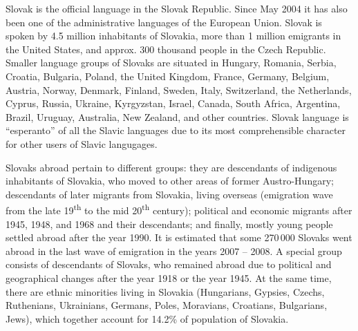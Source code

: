 \begin{multicols}{2}
Slovak is the official language in the Slovak Republic. Since May 2004 it has also been one of the administrative languages of the European Union. Slovak is spoken by 4.5 million inhabitants of Slovakia, more than 1 million emigrants in the United States, and approx. 300 thousand people in the Czech Republic. Smaller language groups of Slovaks are situated in Hungary, Romania, Serbia, Croatia, Bulgaria, Poland, the United Kingdom, France, Germany, Belgium, Austria, Norway, Denmark, Finland, Sweden, Italy, Switzerland, the Netherlands, Cyprus, Russia, Ukraine, Kyrgyzstan, Israel, Canada, South Africa, Argentina, Brazil, Uruguay, Australia, New Zealand,  and other countries. Slovak language is ``esperanto'' of all the Slavic languages due to its most comprehensible character for other users of Slavic langugages.


 Slovaks abroad pertain to different groups: they are descendants of indigenous
inhabitants of Slovakia, who moved to other areas of former Austro-Hungary;
descendants of later migrants from Slovakia, living overseas (emigration wave
from the late 19\textsuperscript{th} to the mid 20\textsuperscript{th}
century); political and economic migrants after 1945, 1948, and 1968 and their
descendants; and finally, mostly young people settled abroad after the year
1990. It is estimated that some 270\,000 Slovaks went abroad in the last wave
of emigration in the years 2007 – 2008. A special group consists of descendants
of  Slovaks, who remained abroad due to political and geographical changes
after the year 1918 or the year 1945. At the same time, there are ethnic
minorities living in Slovakia (Hungarians, Gypsies, Czechs, Ruthenians,
Ukrainians, Germans, Poles, Moravians, Croatians, Bulgarians, Jews), which
together account for 14.2\% of population of Slovakia.


\end{multicols}
